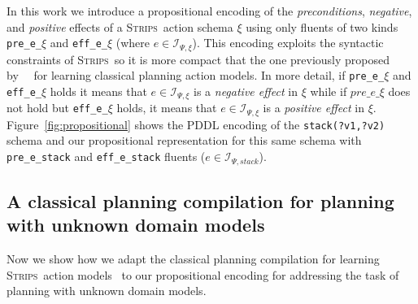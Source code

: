 \documentclass{article}
\newcommand{\strips}{\textsc{Strips}}
\begin{document}
In this work we introduce a propositional encoding of the {\em preconditions}, {\em negative}, and {\em positive} effects of a \strips\ action schema $\xi$ using only fluents of two kinds {\tt\small pre\_e\_$\xi$} and {\tt\small eff\_e\_$\xi$} (where $e\in{\mathcal I}_{\Psi,\xi}$). This encoding exploits the syntactic constraints of \strips\, so it is more compact that the one previously proposed by~\citeauthor{aineto2018learning}~\citeyear{aineto2018learning} for learning classical planning action models. In more detail, if {\tt\small pre\_e\_$\xi$} and {\tt\small eff\_e\_$\xi$} holds it means that $e\in{\mathcal I}_{\Psi,\xi}$ is a {\em negative effect} in $\xi$ while if $pre\_e\_\xi$ does not hold but {\tt\small eff\_e\_$\xi$} holds, it means that $e\in{\mathcal I}_{\Psi,\xi}$ is a {\em positive effect} in $\xi$. Figure~\ref{fig:propositional} shows the PDDL encoding of the {\tt\small stack(?v1,?v2)} schema and our propositional representation for this same schema with {\tt\small pre\_e\_stack} and {\tt\small eff\_e\_stack} fluents ($e\in{\mathcal I}_{\Psi,stack}$).

\subsection{A classical planning compilation for planning with unknown domain models}
Now we show how we adapt the classical planning compilation for learning \strips\ action models~\cite{aineto2018learning} to our propositional encoding for addressing the task of planning with unknown domain models.
\end{document}
